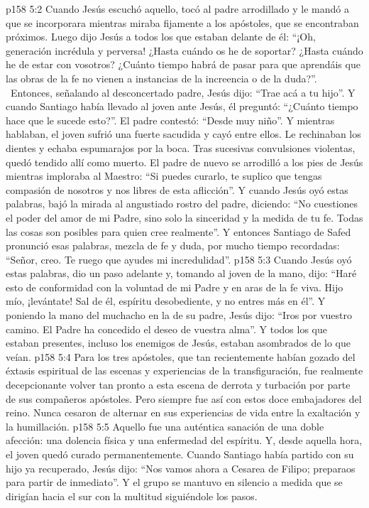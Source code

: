 \vs p158 5:2 Cuando Jesús escuchó aquello, tocó al padre arrodillado y le mandó a que se incorporara mientras miraba fijamente a los apóstoles, que se encontraban próximos. Luego dijo Jesús a todos los que estaban delante de él: “¡Oh, generación incrédula y perversa! ¿Hasta cuándo os he de soportar? ¿Hasta cuándo he de estar con vosotros? ¿Cuánto tiempo habrá de pasar para que aprendáis que las obras de la fe no vienen a instancias de la increencia o de la duda?”.  Entonces, señalando al desconcertado padre, Jesús dijo: “Trae acá a tu hijo”. Y cuando Santiago había llevado al joven ante Jesús, él preguntó: “¿Cuánto tiempo hace que le sucede esto?”. El padre contestó: “Desde muy niño”. Y mientras hablaban, el joven sufrió una fuerte sacudida y cayó entre ellos. Le rechinaban los dientes y echaba espumarajos por la boca. Tras sucesivas convulsiones violentas, quedó tendido allí como muerto. El padre de nuevo se arrodilló a los pies de Jesús mientras imploraba al Maestro: “Si puedes curarlo, te suplico que tengas compasión de nosotros y nos libres de esta aflicción”. Y cuando Jesús oyó estas palabras, bajó la mirada al angustiado rostro del padre, diciendo: “No cuestiones el poder del amor de mi Padre, sino solo la sinceridad y la medida de tu fe. Todas las cosas son posibles para quien cree realmente”. Y entonces Santiago de Safed pronunció esas palabras, mezcla de fe y duda, por mucho tiempo recordadas: “Señor, creo. Te ruego que ayudes mi incredulidad”.
\vs p158 5:3 Cuando Jesús oyó estas palabras, dio un paso adelante y, tomando al joven de la mano, dijo: “Haré esto de conformidad con la voluntad de mi Padre y en aras de la fe viva. Hijo mío, ¡levántate! Sal de él, espíritu desobediente, y no entres más en él”. Y poniendo la mano del muchacho en la de su padre, Jesús dijo: “Iros por vuestro camino. El Padre ha concedido el deseo de vuestra alma”. Y todos los que estaban presentes, incluso los enemigos de Jesús, estaban asombrados de lo que veían.
\vs p158 5:4 Para los tres apóstoles, que tan recientemente habían gozado del éxtasis espiritual de las escenas y experiencias de la transfiguración, fue realmente decepcionante volver tan pronto a esta escena de derrota y turbación por parte de sus compañeros apóstoles. Pero siempre fue así con estos doce embajadores del reino. Nunca cesaron de alternar en sus experiencias de vida entre la exaltación y la humillación.
\vs p158 5:5 Aquello fue una auténtica sanación de una doble afección: una dolencia física y una enfermedad del espíritu. Y, desde aquella hora, el joven quedó curado permanentemente. Cuando Santiago había partido con su hijo ya recuperado, Jesús dijo: “Nos vamos ahora a Cesarea de Filipo; preparaos para partir de inmediato”. Y el grupo se mantuvo en silencio a medida que se dirigían hacia el sur con la multitud siguiéndole los pasos.
